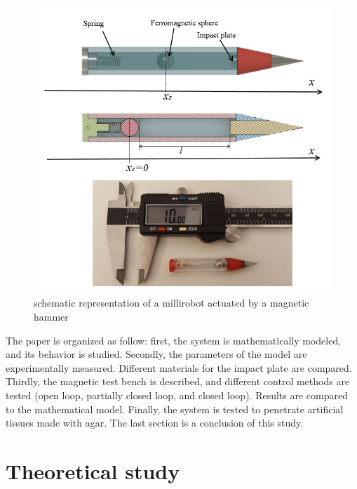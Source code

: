\documentclass[letterpaper, 10 pt, conference]{ieeeconf}  %
\begin{document}
\begin{figure}
  \includegraphics[width=\linewidth]{figure1-2.png}
  \caption{schematic representation of a millirobot actuated by a magnetic hammer}
  \label{millirobot}
\end{figure}

The paper is organized as follow: first, the system is mathematically modeled, and its behavior is studied. Secondly, the parameters of the model are experimentally measured. Different materials for the impact plate are compared. Thirdly, the magnetic test bench is described, and different control methods are tested (open loop, partially closed loop, and closed loop). Results are compared to the mathematical model. Finally, the system is tested to penetrate artificial tissues made with agar. The last section is a conclusion of this study.


\section{Theoretical study}
\end{document}
